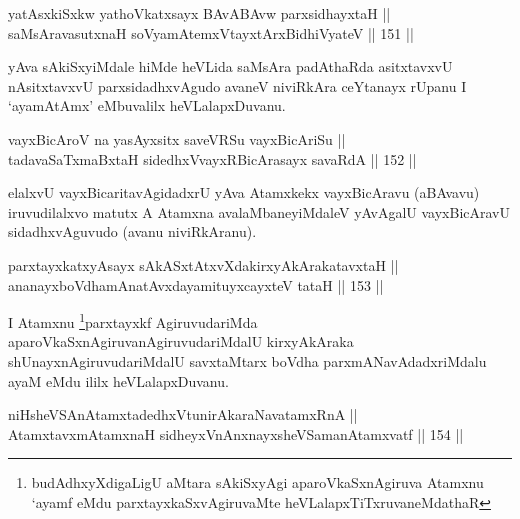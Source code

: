 
\begin{shl}
yatAsxkiSxkw yathoVkatxsayx BAvABAvw parxsidhayxtaH || \\
saMsAravasutxnaH soV\s yamAtemxVtayxtArxBidhiVyateV \hfill || 151 ||  
\end{shl}

\begin{artha}
yAva sAkiSxyiMdale hiMde heVLida saMsAra padAthaRda asitxtavxvU
nAsitxtavxvU parxsidadhxvAgudo avaneV niviRkAra ceYtanayx rUpanu I
`ayamAtAmx' eMbuvalilx heVLalapxDuvanu.
\end{artha}


\begin{shl}
vayxBicAroV na yasAyxsitx saveVRSu vayxBicAriSu || \\
tadavaSaTxmaBxtaH sidedhxVvayxRBicArasayx savaRdA \hfill || 152 || 
\end{shl}

\begin{artha}
elalxvU vayxBicaritavAgidadxrU yAva Atamxkekx vayxBicAravu (aBAvavu) iruvudilalxvo matutx A Atamxna avalaMbaneyiMdaleV yAvAgalU vayxBicAravU sidadhxvAguvudo (avanu niviRkAranu).
\end{artha}


\begin{shl}
parxtayxkatxyA\s sayx sAkASxtAtxvXdakirxyAkArakatavxtaH ||  \\
ananayxboVdhamAnatAvxdayamituyxcayxteV tataH \hfill || 153 ||  
\end{shl}

\begin{artha}
I Atamxnu \footnote{budAdhxyXdigaLigU aMtara sAkiSxyAgi aparoVkaSxnAgiruva Atamxnu `ayamf eMdu parxtayxkaSxvAgiruvaMte heVLalapxTiTxruvaneMdathaR}parxtayxkf AgiruvudariMda aparoVkaSxnAgiruvanAgiruvudariMdalU kirxyAkAraka shUnayxnAgiruvudariMdalU savxtaMtarx boVdha parxmANavAdadxriMdalu ayaM eMdu ililx heVLalapxDuvanu.
\end{artha}


\begin{shl}
niHsheVSAnAtamxtadedhxVtunirAkaraNavatamxRnA || \\
AtamxtavxmAtamxnaH sidheyxVnAnxnayxsheVSamanAtamxvatf \hfill || 154 ||  
\end{shl}

